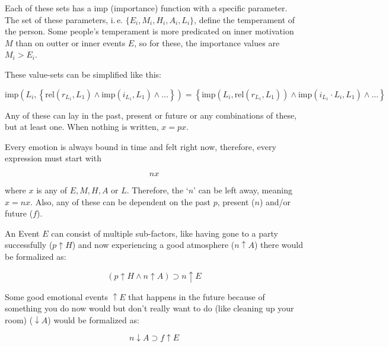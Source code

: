 \documentclass{scrartcl}
\begin{document}
Each of these sets has a imp (importance) function with a specific parameter. The set of these parameters, i.\,e. $\{E_i, M_i, H_i, A_i, L_i\}$, define the temperament of the
person. Some people's temperament is more predicated on inner motivation $M$ than on outter or inner events $E$, so for these, the importance values are $M_i > E_i$.

These value-sets can be simplified like this:

\begin{equation}
	\mathrm{imp}\left(L_i, \left\{\textrm{rel}\left(r_{L_1}, L_1\right) \wedge \textrm{imp}\left(i_{L_1}, L_1\right) \wedge \dots\right\}\right) =
	\left\{\mathrm{imp}\left(L_i, \textrm{rel}\left(r_{L_1}, L_1\right)\right) \wedge \textrm{imp}\left(i_{L_1} \cdot L_i, L_1\right) \wedge \dots\right\}
\end{equation}


Any of these can lay in the past, present or future or any combinations of these, but at least one. When nothing is written, $x = p x$. 

Every emotion is always bound in time and felt right now, therefore, every expression must start with

\begin{equation} n x \end{equation}

where $x$ is any of $E, M, H, A$ or $L$. Therefore, the `$n$' can be left away, meaning $x = n x$. Also, any of these can
be dependent on the past $p$, present ($n$) and/or future ($f$).

An Event $E$ can consist of multiple sub-factors, like having gone to a party successfully ($p \uparrow H$) and now experiencing a good atmosphere ($n \uparrow A$) 
there would be formalized as:

\begin{equation}
	\left(
		p \uparrow H \wedge n \uparrow A
	\right)
	\supset n \uparrow E 
\end{equation}

Some good emotional events $\uparrow E$ that happens in the future because of something you do now would but don't really want to do (like cleaning up
your room) ($\downarrow A$) would be formalized as:

\begin{equation}
	n \downarrow A \supset f \uparrow E
\end{equation}
\end{document}
